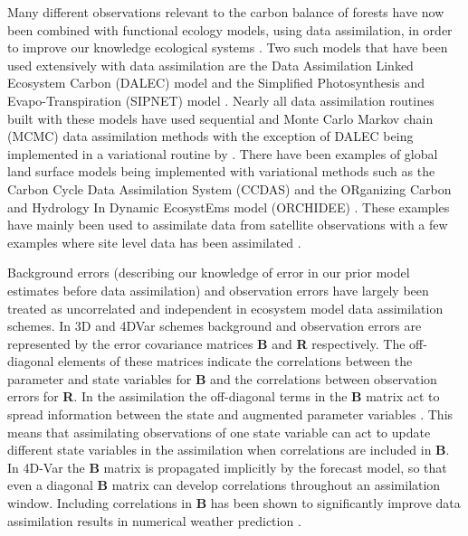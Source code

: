 \documentclass[11pt]{article}
\begin{document}
Many different observations relevant to the carbon balance of forests have now been combined with functional ecology models, using data assimilation, in order to improve our knowledge ecological systems \citep{zobitz2011primer, fox2009reflex, richardson2010estimating, Quaife2008, Zobitz2014, Niu2014}. Two such models that have been used extensively with data assimilation are the Data Assimilation Linked Ecosystem Carbon (DALEC) model \citep{williams2005improved} and the Simplified Photosynthesis and Evapo-Transpiration (SIPNET) model \citep{braswell2005estimating}. Nearly all data assimilation routines built with these models have used sequential and Monte Carlo Markov chain (MCMC) data assimilation methods with the exception of DALEC being implemented in a variational routine by \citet{delahaies2013regularization}. There have been examples of global land surface models being implemented with variational methods such as the Carbon Cycle Data Assimilation System (CCDAS) \citep{Kaminski2013} and the ORganizing Carbon and Hydrology In Dynamic EcosystEms model (ORCHIDEE) \citep{Krinner2005}. These examples have mainly been used to assimilate data from satellite observations with a few examples where site level data has been assimilated \citep{Verbeeck2011, Bacour2015}.

Background errors (describing our knowledge of error in our prior model estimates before data assimilation) and observation errors have largely been treated as uncorrelated and independent in ecosystem model data assimilation schemes. In 3D and 4DVar schemes background and observation errors are represented by the error covariance matrices \textbf{B} and \textbf{R} respectively. The off-diagonal elements of these matrices indicate the correlations between the parameter and state variables for \textbf{B} and the correlations between observation errors for \textbf{R}. In the assimilation the off-diagonal terms in the \textbf{B} matrix act to spread information between the state and augmented parameter variables \citep{kalnay2003atmospheric}. This means that assimilating observations of one state variable can act to update different state variables in the assimilation when correlations are included in \textbf{B}. In 4D-Var the \textbf{B} matrix is propagated implicitly by the forecast model, so that even a diagonal \textbf{B} matrix can develop correlations throughout an assimilation window. Including correlations in \textbf{B} has been shown to significantly improve data assimilation results in numerical weather prediction \citep{bannister2008review}. 
\end{document}
